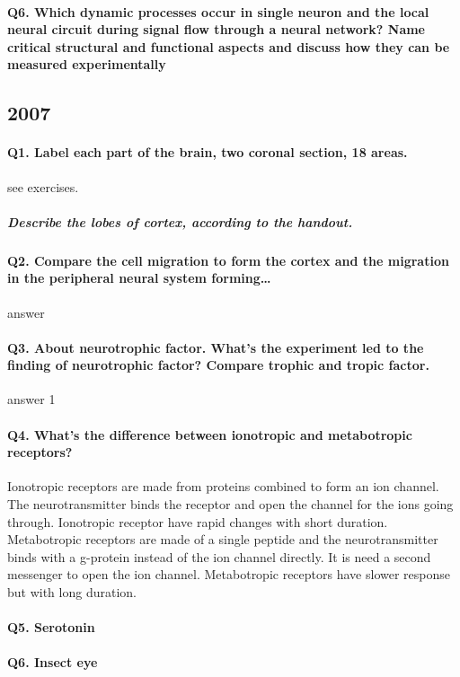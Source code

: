 \documentclass[12pt,article,oneside,a4paper]{memoir}
\begin{document}
\paragraph{Q6. Which dynamic processes occur in single neuron and the local neural circuit during signal flow through a neural network? Name critical structural and functional aspects and discuss how they can be measured experimentally}

\subsection{2007}

\paragraph{Q1. Label each part of the brain, two coronal section, 18 areas.} see exercises.
\subparagraph{Describe the lobes of cortex, according to the handout.} 
\paragraph{Q2. Compare the cell migration to form the cortex and the migration in the peripheral neural system forming…} answer
\paragraph{Q3. About neurotrophic factor. What’s the experiment led to the finding of neurotrophic factor? Compare trophic and tropic factor.} answer	1
\paragraph{Q4. What’s the difference between ionotropic and metabotropic receptors?} Ionotropic receptors are made from proteins combined to form an ion channel. The neurotransmitter binds the receptor and open the channel for the ions going through. Ionotropic receptor have rapid changes with short duration. Metabotropic receptors are made of a single peptide and the neurotransmitter binds with a g-protein instead of the ion channel directly. It is need a second messenger to open the ion channel. Metabotropic receptors have slower response but with long duration.
\paragraph{Q5. Serotonin}
\paragraph{Q6. Insect eye}
\end{document}
